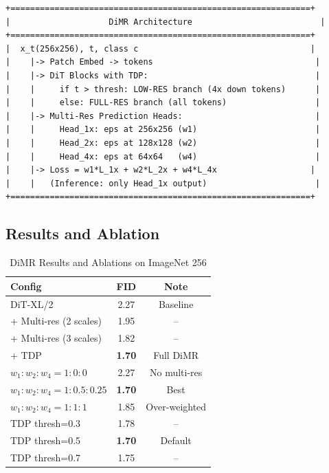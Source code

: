 \documentclass[11pt, a4paper]{article}
\begin{document}
\begin{lstlisting}[style=flowchart, caption={DiMR Architecture}]
+=============================================================+
|                    DiMR Architecture                          |
+=============================================================+
|  x_t(256x256), t, class c                                   |
|    |-> Patch Embed -> tokens                                 |
|    |-> DiT Blocks with TDP:                                  |
|    |     if t > thresh: LOW-RES branch (4x down tokens)      |
|    |     else: FULL-RES branch (all tokens)                  |
|    |-> Multi-Res Prediction Heads:                           |
|    |     Head_1x: eps at 256x256 (w1)                        |
|    |     Head_2x: eps at 128x128 (w2)                        |
|    |     Head_4x: eps at 64x64   (w4)                        |
|    |-> Loss = w1*L_1x + w2*L_2x + w4*L_4x                   |
|    |   (Inference: only Head_1x output)                      |
+=============================================================+
\end{lstlisting}

\subsection{Results and Ablation}

\begin{table}[H]
\centering
\caption{DiMR Results and Ablations on ImageNet 256}
\begin{tabular}{lcc}
\toprule
Config & FID & Note \\
\midrule
DiT-XL/2 & 2.27 & Baseline \\
+ Multi-res (2 scales) & 1.95 & -- \\
+ Multi-res (3 scales) & 1.82 & -- \\
+ TDP & \textbf{1.70} & Full DiMR \\
\midrule
$w_1:w_2:w_4 = 1:0:0$ & 2.27 & No multi-res \\
$w_1:w_2:w_4 = 1:0.5:0.25$ & \textbf{1.70} & Best \\
$w_1:w_2:w_4 = 1:1:1$ & 1.85 & Over-weighted \\
\midrule
TDP thresh=0.3 & 1.78 & -- \\
TDP thresh=0.5 & \textbf{1.70} & Default \\
TDP thresh=0.7 & 1.75 & -- \\
\bottomrule
\end{tabular}
\end{table}
\end{document}
